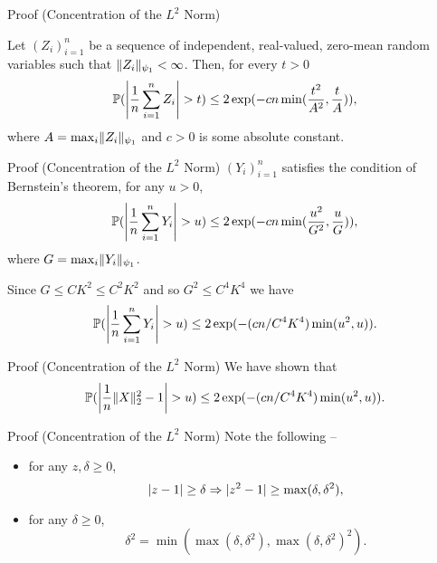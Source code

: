 \documentclass{beamer}
\begin{document}
  \begin{frame}{Proof (Concentration of the \(L^{2}\) Norm)}
    \begin{theorem}[Bernstein]
      \label{thm:bernsteins-ineq}
      Let \((Z_{i})_{i=1}^{n}\) be a sequence of independent, real-valued, zero-mean
      random variables such that \(\norm{Z_{i}}_{\psi_{1}} < \infty\). Then, for
      every \(t > 0\)
      \begin{equation}
        \Pr(\abs*{\frac{1}{n}\sum_{i=1}^{n}Z_{i}} > t) \leq 2\exp(-cn\min(\frac{t^{2}}{A^{2}}, \frac{t}{A})),
      \end{equation}
      where \(A = \max_{i}\norm{Z_{i}}_{\psi_{1}}\) and \(c > 0\) is some absolute constant.
    \end{theorem}
  \end{frame}

  \begin{frame}{Proof (Concentration of the \(L^{2}\) Norm)}
    \((Y_{i})_{i=1}^{n}\) satisfies the condition of Bernstein's theorem, \pause for any \(u > 0\),
    \begin{equation}
      \Pr(\abs*{\frac{1}{n}\sum_{i=1}^{n}Y_{i}} > u) \leq 2 \exp(-cn\min(\frac{u^{2}}{G^{2}}, \frac{u}{G})),
    \end{equation}
    where \(G = \max_{i}\norm{Y_{i}}_{\psi_{1}}\). \pause

    Since \(G \leq CK^{2} \leq C^{2}K^{2}\) and so \(G^{2} \leq C^{4}K^{4}\) we have
    \begin{equation}
      \label{eq:2}
      \Pr(\abs*{\frac{1}{n}\sum_{i=1}^{n}Y_{i}} > u) \leq 2 \exp(-(cn / C^{4}K^{4})\min(u^{2}, u)).
    \end{equation}
  \end{frame}

  \begin{frame}{Proof (Concentration of the \(L^{2}\) Norm)}
    We have shown that
    \begin{equation}
      \Pr(\abs*{\frac{1}{n}\norm{X}_{2}^{2} - 1} > u) \leq 2 \exp(-(cn / C^{4}K^{4})\min(u^{2}, u)).
    \end{equation}
  \end{frame}

  \begin{frame}{Proof (Concentration of the \(L^{2}\) Norm)}
    Note the following -- \pause
    \begin{itemize}
      \item for any \(z, \delta \geq 0\),
      \begin{equation}
        \label{eq:zp1-delta-observation}
        \abs{z - 1} \geq \delta \Rightarrow \abs{z^{2} - 1} \geq \max(\delta, \delta^{2}),
      \end{equation}
      \pause
      \item for any \(\delta \geq 0\),
      \begin{equation}
        \delta^{2} = \min(\max(\delta, \delta^{2}), \max(\delta, \delta^{2})^{2}).
      \end{equation}
    \end{itemize}
  \end{frame}
\end{document}
